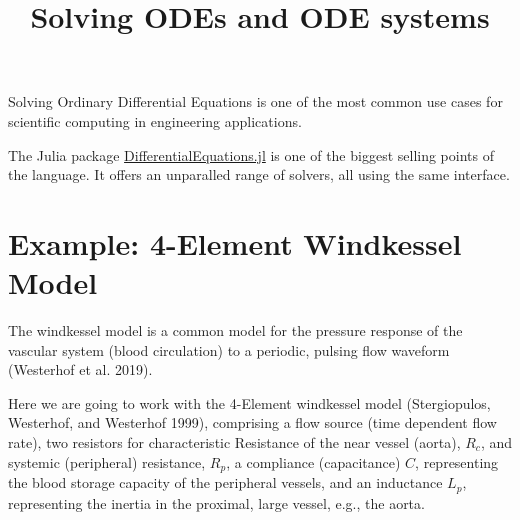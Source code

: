 \documentclass[
  a4paper,
  DIV=11,
  numbers=noendperiod,
  oneside]{scrreprt}
\title{Solving ODEs and ODE systems}
\author{}
\date{}
\begin{document}
\maketitle
\ifdefined\Shaded\renewenvironment{Shaded}{\begin{tcolorbox}[enhanced, boxrule=0pt, borderline west={3pt}{0pt}{shadecolor}, frame hidden, interior hidden, sharp corners, breakable]}{\end{tcolorbox}}\fi

Solving Ordinary Differential Equations is one of the most common use
cases for scientific computing in engineering applications.

The Julia package
\href{https://docs.sciml.ai/DiffEqDocs/stable/}{DifferentialEquations.jl}
is one of the biggest selling points of the language. It offers an
unparalled range of solvers, all using the same interface.

\hypertarget{example-4-element-windkessel-model}{%
\section{Example: 4-Element Windkessel
Model}\label{example-4-element-windkessel-model}}

The windkessel model is a common model for the pressure response of the
vascular system (blood circulation) to a periodic, pulsing flow waveform
(Westerhof et al.
2019).

Here we are going to work with the 4-Element windkessel model
(Stergiopulos, Westerhof, and Westerhof
1999),
comprising a flow source (time dependent flow rate), two resistors for
characteristic Resistance of the near vessel (aorta), \(R_{c}\), and
systemic (peripheral) resistance, \(R_{p}\), a compliance (capacitance)
\(C\), representing the blood storage capacity of the peripheral
vessels, and an inductance \(L_p\), representing the inertia in the
proximal, large vessel, e.g., the aorta.
\end{document}
